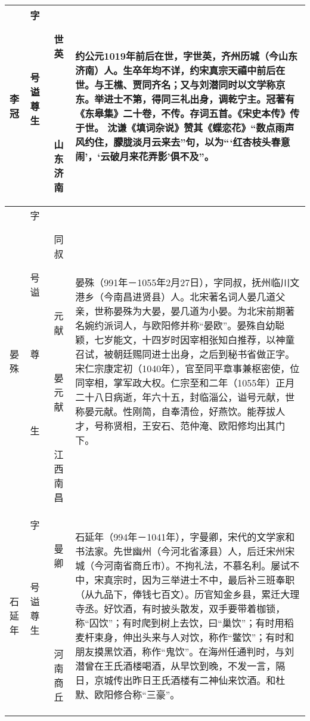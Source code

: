 \begin{longtable}{|>{\centering\namefont\heiti}m{2em}|>{\centering\tiny}m{3.0em}|>{\xzfont\kaiti}m{7.3em}|}
  李冠 & \begin{description}
  \item[字] 世英
  \item[号] 
  \item[谥] 
  \item[尊] 
  \item[生] 山东济南
  \end{description} & 约公元1019年前后在世，字世英，齐州历城（今山东济南）人。生卒年均不详，约宋真宗天禧中前后在世。与王樵、贾同齐名；又与刘潜同时以文学称京东。举进士不第，得同三礼出身，调乾宁主。冠著有《东皋集》二十卷，不传。存词五首。《宋史本传》传于世。 沈谦《填词杂说》赞其《蝶恋花》“数点雨声风约住，朦胧淡月云来去”句，以为“‘红杏枝头春意闹’，‘云破月来花弄影’俱不及”。 \tabularnewline\hline
  晏殊 & \begin{description}
  \item[字] 同叔
  \item[号] 
  \item[谥] 元献
  \item[尊] 晏元献
  \item[生] 江西南昌
  \end{description} & 晏殊（991年－1055年2月27日），字同叔，抚州临川文港乡（今南昌进贤县）人。北宋著名词人晏几道父亲，世称晏殊为大晏，晏几道为小晏。为北宋前期著名婉约派词人，与欧阳修并称“晏欧”。晏殊自幼聪颖，七岁能文，十四岁时因宰相张知白推荐，以神童召试，被朝廷赐同进士出身，之后到秘书省做正字。宋仁宗康定初（1040年），官至同平章事兼枢密使，位同宰相，掌军政大权。仁宗至和二年（1055年）正月二十八日病逝，年六十五，封临淄公，谥号元献，世称晏元献。性刚简，自奉清俭，好燕饮。能荐拔人才，号称贤相，王安石、范仲淹、欧阳修均出其门下。 \tabularnewline\hline
  石延年 & \begin{description}
  \item[字] 曼卿
  \item[号] 
  \item[谥] 
  \item[尊] 
  \item[生] 河南商丘
  \end{description} & 石延年（994年－1041年），字曼卿，宋代的文学家和书法家。先世幽州（今河北省涿县）人，后迁宋州宋城（今河南省商丘市）。不拘礼法，不慕名利。屡试不中，宋真宗时，因为三举进士不中，最后补三班奉职（从九品下，俸钱七百文）。历官知金乡县，累迁大理寺丞。好饮酒，有时披头散发，双手要带着枷锁，称“囚饮”；有时爬到树上去饮，曰“巢饮”；有时用稻麦杆束身，伸出头来与人对饮，称作“鳖饮”；有时和朋友摸黑饮酒，称作“鬼饮”。在海州任通判时，与刘潜曾在王氏酒楼喝酒，从早饮到晚，不发一言，隔日，京城传出昨日王氏酒楼有二神仙来饮酒。和杜默、欧阳修合称“三豪”。 \tabularnewline\hline

\end{longtable}
